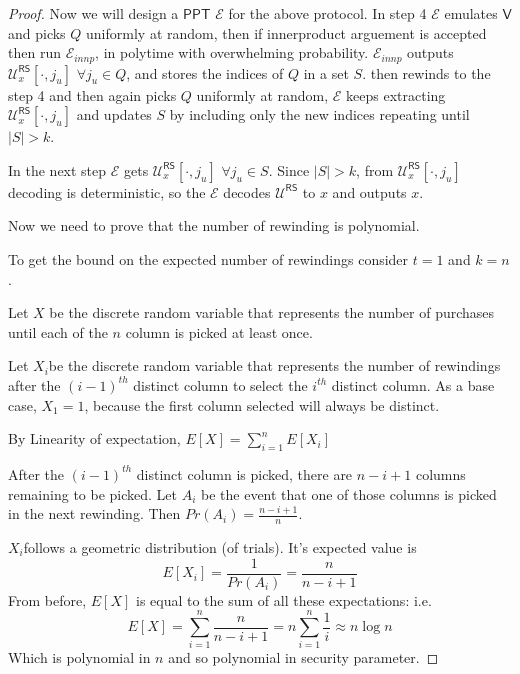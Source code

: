 \documentclass[runningheads]{llncs}
\newcommand{\pnote}[1] {\textcolor{red}  {PKP: \sl{#1}}}
\def\ppt{\mathsf{PPT}}
\def\extrac{\mathcal{E}}
\def\verifier{\mathsf{V}}
\def\RS{\mathsf{RS}} %
\def\oracle{\mathcal{U}^{\RS}}
\begin{document}
	\begin{proof}
		Now we will design a $\ppt$ $\extrac$ for the above protocol.
		In step 4 $\extrac$ emulates $\verifier$ and picks $Q$ uniformly at random, then if innerproduct arguement is accepted then run $\extrac_{innp}$, in polytime with overwhelming probability. $\extrac_{innp}$ outputs $\oracle_x[\cdot,j_u]$ $\forall j_u\in Q$, and stores the indices of $Q$ in a set $S$. then rewinds to the step 4 and then again picks $Q$ uniformly at random, $\extrac$ keeps extracting $\oracle_x[\cdot,j_u]$ and updates $S$ by including only the new indices repeating until $|S|>k$.
		
		In the next step $\extrac$ gets $\oracle_x[\cdot,j_u]$ $\forall j_u \in S$. Since $|S|>k$, from $\oracle_x[\cdot,j_u]$ decoding is deterministic, so the $\extrac$ decodes $\oracle$ to $x$ and outputs $x$.
		
		Now we need to prove that the number of rewinding is polynomial.
		
		To get the bound on the expected number of rewindings consider $t=1$ and $k=n$. 
		
		Let $X$ be the discrete random variable that represents the number of purchases until each of the $n$ column is picked at least once.
		
		Let $X_i$​ be the discrete random variable that represents the number of rewindings after the $(i-1)^{th}$ distinct column to select the $i^{th}$ distinct column. As a base case, $X_1=1$, because the first column selected will always be distinct.
		
		By Linearity of expectation, $E[X]=\sum_{i=1}^{n}E[X_i]$
		
		After the $(i-1)^{th}$ distinct column is picked, there are $n-i+1$ columns remaining to be picked. Let $A_i$ be the event that one of those columns is picked in the next rewinding. Then $Pr(A_i)=\frac{n-i+1}{n}$.
		
		$X_i$​ follows a geometric distribution (of trials). It's expected value is
		 $$E[X_i]= \frac{1}{Pr(A_i)} = \frac{n}{n-i+1}$$
		From before, $E[X]$ is equal to the sum of all these expectations: i.e.
		$$E[X] = \sum\limits_{i=1}^{n} \frac{n}{n-i+1} = n\sum\limits_{i=1}^{n} \frac{1}{i} \approx n \log n$$
		Which is polynomial in $n$ and so polynomial in security parameter.
	\end{proof}
	
\end{document}
